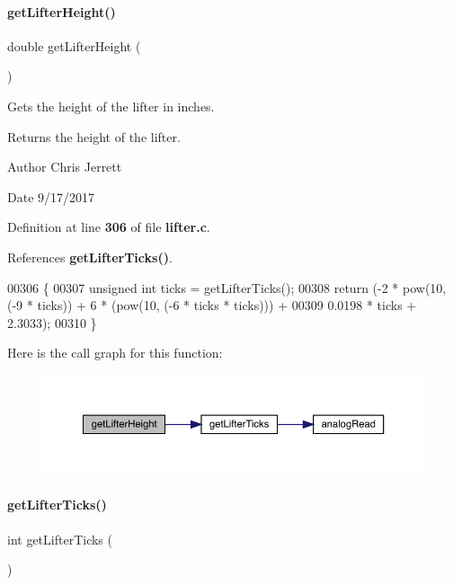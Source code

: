 \paragraph{get\+Lifter\+Height()}
{\footnotesize\ttfamily double get\+Lifter\+Height (\begin{DoxyParamCaption}{ }\end{DoxyParamCaption})}



Gets the height of the lifter in inches. 

\begin{DoxyReturn}{Returns}
the height of the lifter. 
\end{DoxyReturn}
\begin{DoxyAuthor}{Author}
Chris Jerrett 
\end{DoxyAuthor}
\begin{DoxyDate}{Date}
9/17/2017 
\end{DoxyDate}


Definition at line \textbf{ 306} of file \textbf{ lifter.\+c}.



References \textbf{ get\+Lifter\+Ticks()}.


\begin{DoxyCode}
00306                          \{
00307   \textcolor{keywordtype}{unsigned} \textcolor{keywordtype}{int} ticks = getLifterTicks();
00308   \textcolor{keywordflow}{return} (-2 * pow(10, (-9 * ticks)) + 6 * (pow(10, (-6 * ticks * ticks))) +
00309           0.0198 * ticks + 2.3033);
00310 \}
\end{DoxyCode}
Here is the call graph for this function\+:
\nopagebreak
\begin{figure}[H]
\begin{center}
\leavevmode
\includegraphics[width=350pt]{lifter_8h_a2719740958fd8a5926f88f6194e820e3_cgraph}
\end{center}
\end{figure}
\mbox{\label{lifter_8h_acdf909159b0406c48099843f2306be78}} 
\paragraph{get\+Lifter\+Ticks()}
{\footnotesize\ttfamily int get\+Lifter\+Ticks (\begin{DoxyParamCaption}{ }\end{DoxyParamCaption})}



